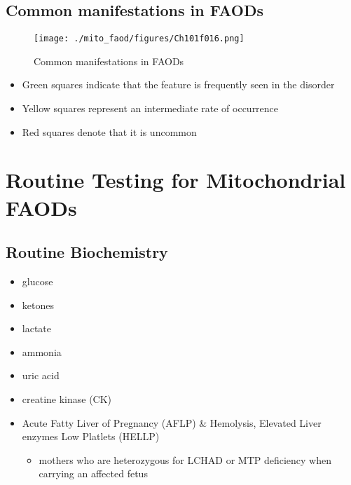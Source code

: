 \documentclass{scrartcl}
\begin{document}
\subsection{Common manifestations in FAODs}
\label{sec:org1ce8495}
\begin{figure}[htbp]
\centering
\texttt{[image: ./mito\_faod/figures/Ch101f016.png]}
\caption{\label{fig:orgec485a8}
Common manifestations in FAODs}
\end{figure}

\begin{itemize}
\item Green squares indicate that the feature is frequently seen in the disorder
\item Yellow squares represent an intermediate rate of occurrence
\item Red squares denote that it is uncommon
\end{itemize}

\section{Routine Testing for Mitochondrial FAODs}
\label{sec:orgc43f738}
\subsection{Routine Biochemistry}
\label{sec:orgdd46d7d}
\begin{itemize}
\item glucose
\item ketones
\item lactate
\item ammonia
\item uric acid
\item creatine kinase (CK)
\item Acute Fatty Liver of Pregnancy (AFLP) \& Hemolysis, Elevated Liver enzymes Low Platlets (HELLP)
\begin{itemize}
\item mothers who are heterozygous for LCHAD or MTP deficiency when
carrying an affected fetus
\end{itemize}
\end{itemize}
\end{document}
